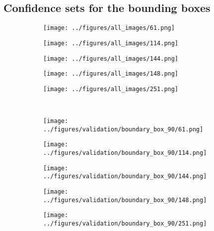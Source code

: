 \newpage
\subsection{Confidence sets for the bounding boxes}
\begin{figure}[h!]
	\begin{subfigure}{0.19\textwidth}
		\centering
		\texttt{[image: ../figures/all\_images/61.png]}
		\label{fig:1}
	\end{subfigure}
	\begin{subfigure}{0.19\textwidth}
		\centering
		\texttt{[image: ../figures/all\_images/114.png]}
		\label{fig:1}
	\end{subfigure}
	\begin{subfigure}{0.19\textwidth}
		\centering
		\texttt{[image: ../figures/all\_images/144.png]}
		\label{fig:1}
	\end{subfigure}
	\begin{subfigure}{0.19\textwidth}
		\centering
		\texttt{[image: ../figures/all\_images/148.png]}
		\label{fig:1}
	\end{subfigure}
	\begin{subfigure}{0.19\textwidth}
		\centering
		\texttt{[image: ../figures/all\_images/251.png]}
		\label{fig:1}
	\end{subfigure}
	\vspace{-0.35cm}
	\\
	\begin{subfigure}{0.19\textwidth}
		\centering
		\texttt{[image: ../figures/validation/boundary\_box\_90/61.png]}
		\label{fig:1}
	\end{subfigure}
	\begin{subfigure}{0.19\textwidth}
		\centering
		\texttt{[image: ../figures/validation/boundary\_box\_90/114.png]}
		\label{fig:1}
	\end{subfigure}
	\begin{subfigure}{0.19\textwidth}
		\centering
		\texttt{[image: ../figures/validation/boundary\_box\_90/144.png]}
		\label{fig:1}
	\end{subfigure}
	\begin{subfigure}{0.19\textwidth}
		\centering
		\texttt{[image: ../figures/validation/boundary\_box\_90/148.png]}
		\label{fig:1}
	\end{subfigure}
	\begin{subfigure}{0.19\textwidth}
		\centering
		\texttt{[image: ../figures/validation/boundary\_box\_90/251.png]}

\end{subfigure}
\end{figure}
